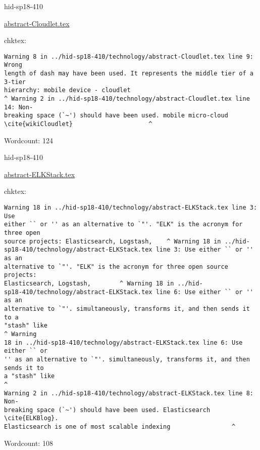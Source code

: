 

\begin{IU}

hid-sp18-410

\href{https://github.com/cloudmesh-community/hid-sp18-410/blob/master//technology/abstract-Cloudlet.tex}{abstract-Cloudlet.tex}

 
chktex:
\begin{tiny}
\begin{verbatim}
Warning 8 in ../hid-sp18-410/technology/abstract-Cloudlet.tex line 9: Wrong
length of dash may have been used. It represents the middle tier of a 3-tier
hierarchy: mobile device - cloudlet
^ Warning 2 in ../hid-sp18-410/technology/abstract-Cloudlet.tex line 14: Non-
breaking space (`~') should have been used. mobile micro-cloud
\cite{wikiCloudlet}                     ^
\end{verbatim}
\end{tiny}

Wordcount: 124

\end{IU}



\begin{IU}

hid-sp18-410

\href{https://github.com/cloudmesh-community/hid-sp18-410/blob/master//technology/abstract-ELKStack.tex}{abstract-ELKStack.tex}

 
chktex:
\begin{tiny}
\begin{verbatim}
Warning 18 in ../hid-sp18-410/technology/abstract-ELKStack.tex line 3: Use
either `` or '' as an alternative to `"'. "ELK" is the acronym for three open
source projects: Elasticsearch, Logstash,    ^ Warning 18 in ../hid-
sp18-410/technology/abstract-ELKStack.tex line 3: Use either `` or '' as an
alternative to `"'. "ELK" is the acronym for three open source projects:
Elasticsearch, Logstash,        ^ Warning 18 in ../hid-
sp18-410/technology/abstract-ELKStack.tex line 6: Use either `` or '' as an
alternative to `"'. simultaneously, transforms it, and then sends it to a
"stash" like                                                          ^ Warning
18 in ../hid-sp18-410/technology/abstract-ELKStack.tex line 6: Use either `` or
'' as an alternative to `"'. simultaneously, transforms it, and then sends it to
a "stash" like                                                                ^
Warning 2 in ../hid-sp18-410/technology/abstract-ELKStack.tex line 8: Non-
breaking space (`~') should have been used. Elasticsearch \cite{ELKBlog}.
Elasticsearch is one of most scalable indexing                 ^
\end{verbatim}
\end{tiny}

Wordcount: 108

\end{IU}

